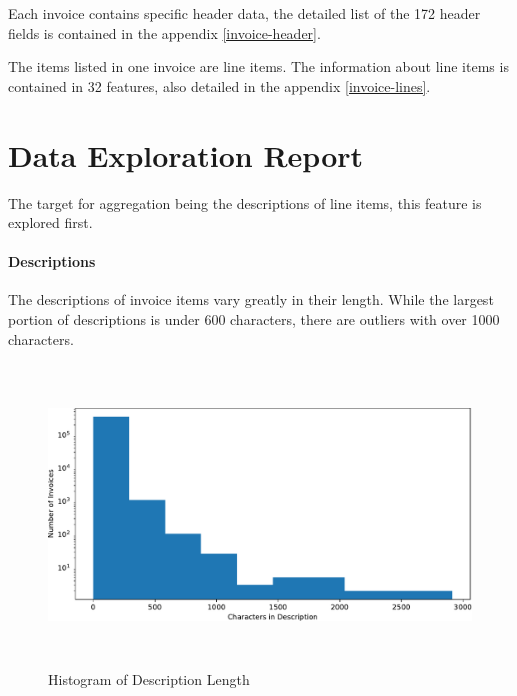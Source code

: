 Each invoice contains specific header data, the detailed list of the 172 header fields is contained in the appendix \ref{invoice-header}. 

The items listed in one invoice are line items. The information about line items is contained in 32 features, also detailed in the appendix \ref{invoice-lines}.

\section{Data Exploration Report}

The target for aggregation being the descriptions of line items, this feature is explored first.

\paragraph{Descriptions}
The descriptions of invoice items vary greatly in their length. While the largest portion of descriptions is under 600 characters, there are outliers with over 1000 characters. 
\begin{figure}[ht]
	\centering
	\includegraphics[height=8cm]{Bilder/hist_description.pdf}
	\caption{Histogram of Description Length}
	\label{fig:languages-bar}
\end{figure}

